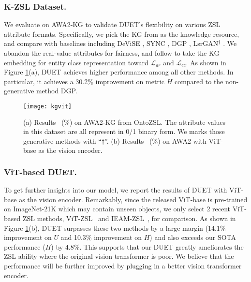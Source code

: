 \documentclass[letterpaper]{article} \usepackage{aaai23}  \usepackage{times}  \usepackage{helvet}  \usepackage{courier}  \usepackage[hyphens]{url}  \usepackage{graphicx} \urlstyle{rm} \def\UrlFont{\rm}  \usepackage{natbib}  \usepackage{caption} \frenchspacing  \setlength{\pdfpagewidth}{8.5in}  \setlength{\pdfpageheight}{11in}  \usepackage{algorithm}
\newcommand{\fy}[1]{{\color{black}#1}}
\begin{document}
\subsubsection{\textbf{K-ZSL Dataset.}}
We evaluate on AWA2-KG \cite{DBLP:conf/www/GengC0PYYJC21} to validate DUET's  flexibility on various ZSL attribute formats.
Specifically,
we pick the KG from \cite{geng2021k} as the knowledge resource, and compare with  baselines
including DeViSE \cite{DBLP:conf/nips/FromeCSBDRM13}, SYNC \cite{changpinyo2016synthesized}, DGP \cite{DBLP:conf/cvpr/KampffmeyerCLWZ19}, LsrGAN$^\dag$ \cite{vyas2020leveraging}. 
We abandon the real-value attributes for {fairness}, and follow \cite{DBLP:conf/www/GengC0PYYJC21,DBLP:journals/corr/abs-2206-03739,DBLP:conf/semweb/0007CGPYC21} to take the KG embedding \cite{DBLP:conf/nips/BordesUGWY13} for entity class representation toward $\mathcal{L}_{ar}$ and $\mathcal{L}_{cc}$.
As shown in Figure \ref{fig:kgvit}(a), DUET achieves higher performance \fy{among} all other methods. In particular, {it achieves \fy{a} 30.2$\%$ improvement \fy{on} metric $H$} compared to the non-generative method DGP.
\begin{figure}[htbp]
  \centering
  \vspace{-5pt}
  \texttt{[image: kgvit]}
  \caption{ (a) Results ~($\%$) on AWA2-KG from OntoZSL. The attribute values in this dataset are all represent in 0/1 binary form. We marks those generative methods with ``$\dag$''. (b) Results ~($\%$) on AWA2 with ViT-base as the vision encoder.}
  \label{fig:kgvit}
  \vspace{-7pt}
\end{figure}
\subsubsection{\textbf{{ViT-based DUET.}}}
To get further insights into our model, we report the results of DUET with ViT-base \cite{DBLP:conf/iclr/DosovitskiyB0WZ21} as the vision encoder.
Remarkably, since the released ViT-base is pre-trained on ImageNet-21K \fy{which} may contain unseen objects,
we only select 2 recent ViT-based ZSL methods, ViT-ZSL~\cite{DBLP:journals/corr/abs-2108-00045} and IEAM-ZSL~\cite{DBLP:conf/eccv/NarayanGKSS20}, for comparison.
As shown in Figure \ref{fig:kgvit}(b), DUET surpasses these two methods by a large margin (14.1$\%$ improvement \fy{on} $U$ and 10.3$\%$ improvement \fy{on} $H$) and also exceeds our SOTA performance ($H$) by 4.8$\%$. 
This supports that our DUET greatly ameliorates the ZSL ability where the original vision transformer is poor.
We believe that the performance will be further improved \fy{by plugging in a better vision transformer encoder.}
\end{document}
